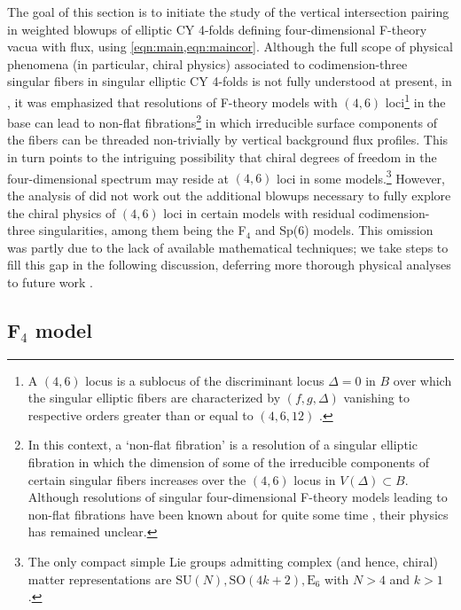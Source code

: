 \documentclass[11pt,oneside,english]{article}
\numberwithin{equation}{section}
\theoremstyle{definition}
\begin{document}
The goal of this section is to initiate the study of the vertical intersection pairing in weighted blowups of elliptic CY 4-folds defining four-dimensional F-theory vacua with flux, using \cref{eqn:main,eqn:maincor}. Although the full scope of physical phenomena (in particular, chiral physics) associated to codimension-three singular fibers in singular elliptic CY 4-folds is not fully understood at present, in \cite{Jefferson:2021bid}, it was emphasized that resolutions of F-theory models with $(4,6)$ loci\footnote{A $(4,6)$ locus is a sublocus of the discriminant locus $\Delta = 0$ in $B$ over which the singular elliptic fibers are characterized by $(f,g,\Delta)$ vanishing to respective orders greater than or equal to $(4,6,12)$ \cite{Candelas:2000nc}.} in the base can lead to non-flat fibrations\footnote{In this context, a `non-flat fibration' is a resolution of a singular elliptic fibration in which the dimension of some of the irreducible components of certain singular fibers increases over the $(4,6)$ locus in $V(\Delta) \subset B$. Although resolutions of singular four-dimensional F-theory models leading to non-flat fibrations have been known about for quite some time \cite{Candelas:2000nc,Hayashi:2009ge,achmed2018note}, their physics has remained unclear.}  in which irreducible surface components of the fibers can be threaded non-trivially by vertical background flux profiles. This in turn points to the intriguing possibility that chiral degrees of freedom in the four-dimensional spectrum may reside at $(4,6)$ loci in some models.\footnote{The only compact simple Lie groups admitting complex (and hence, chiral) matter representations are $\text{SU}(N), \text{SO}(4k+2), \text{E}_6$ with $N>4$ and $k>1$.} However, the analysis of \cite{Jefferson:2021bid} did not work out the additional blowups necessary to fully explore the chiral physics of $(4,6)$ loci in certain models with residual codimension-three singularities, among them being the F$_4$ and Sp(6) models. This omission was partly due to the lack of available mathematical techniques; we take steps to fill this gap in the following discussion, deferring more thorough physical analyses to future work \cite{JLT}.




\subsection{F$_4$ model}
\end{document}
